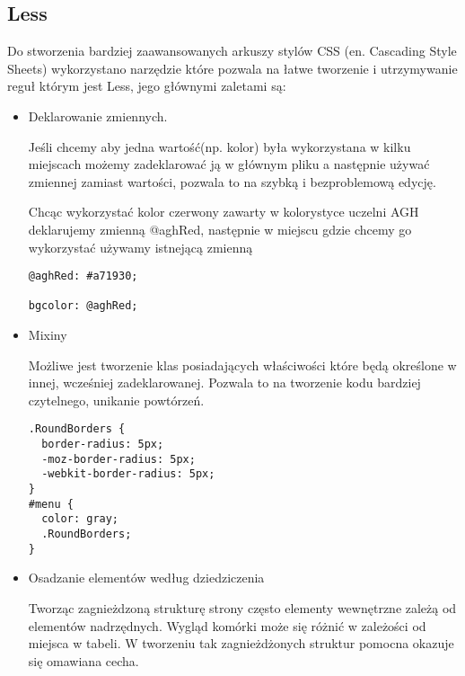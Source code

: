 \subsection{Less}
\label{sec:less}

Do stworzenia bardziej zaawansowanych arkuszy stylów CSS (en. Cascading Style Sheets) wykorzystano narzędzie które pozwala na łatwe tworzenie i utrzymywanie reguł którym jest Less, jego głównymi zaletami są:

\begin{itemize}
\item
Deklarowanie zmiennych.

Jeśli chcemy aby jedna wartość(np. kolor) była wykorzystana w kilku miejscach możemy zadeklarować ją w głównym pliku  a następnie używać zmiennej zamiast wartości, pozwala to na szybką i bezproblemową edycję.

Chcąc wykorzystać kolor czerwony zawarty w kolorystyce uczelni AGH deklarujemy zmienną @aghRed, następnie w miejscu gdzie chcemy go wykorzystać używamy istnejącą zmienną

\lstset{language=JavaScript}
\label{lis:webSql}
\begin{lstlisting}[caption=Deklaracja zmiennych]
@aghRed: #a71930;

bgcolor: @aghRed;
\end{lstlisting}

\item
Mixiny

Możliwe jest tworzenie klas posiadających  właściwości które będą określone w innej, wcześniej zadeklarowanej. Pozwala to na tworzenie kodu bardziej czytelnego, unikanie powtórzeń.


\lstset{language=JavaScript}
\label{lis:webSql}
\begin{lstlisting}[caption=Mixin]
.RoundBorders {
  border-radius: 5px;
  -moz-border-radius: 5px;
  -webkit-border-radius: 5px;
}
#menu {
  color: gray;
  .RoundBorders;
}
\end{lstlisting}

\item
Osadzanie elementów według dziedziczenia

Tworząc zagnieżdzoną strukturę strony często elementy wewnętrzne zależą od elementów nadrzędnych. Wygląd komórki może się różnić w zależości od miejsca w tabeli. W tworzeniu tak zagnieżdżonych struktur pomocna okazuje się omawiana cecha.

\end{itemize}
